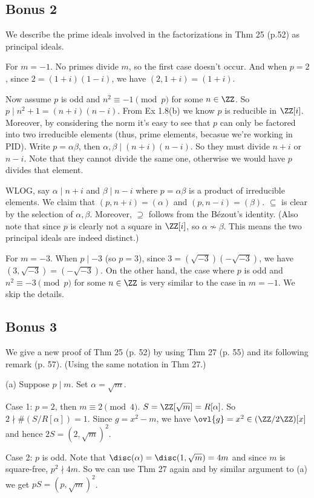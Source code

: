 \documentclass[../Chapter.tex]{subfiles}
\begin{document}
\subsection*{Bonus 2}

We describe the prime ideals involved in the factorizations in Thm 25 (p.52) as principal ideals.

For $m=-1$. No primes divide $m$, so the first case doesn't occur. And when $p=2$, since $2=(1+i)(1-i)$, we have $(2,1+i)=(1+i)$.

Now assume $p$ is odd and $n^2\equiv -1 \pmod{p}$ for some $n\in\ZZ$. So $p\mid n^2+1=(n+i)(n-i)$. From Ex 1.8(b) we know $p$ is reducible in $\ZZ[i]$. Moreover, by considering the norm it's easy to see that $p$ can only be factored into two irreducible elements (thus, prime elements, becasue we're working in PID). Write $p=\alpha\beta$, then $\alpha,\beta\mid(n+i)(n-i)$. So they must divide $n+i$ or $n-i$. Note that they cannot divide the same one, otherwise we would have $p$ divides that element.

WLOG, say $\alpha\mid n+i$ and $\beta\mid n-i$ where $p=\alpha\beta$ is a product of irreducible elements. We claim that $(p,n+i)=(\alpha)$ and $(p,n-i)=(\beta)$. $\subseteq$ is clear by the selection of $\alpha,\beta$. Moreover, $\supseteq$ follows from the Bézout's identity. (Also note that since $p$ is clearly not a square in $\ZZ[i]$, so $\alpha\nsim\beta$. This means the two principal ideals are indeed distinct.)

For $m=-3$. When $p\mid -3$ (so $p=3$), since $3=(\sqrt{-3})(-\sqrt{-3})$, we have $(3,\sqrt{-3})=(-\sqrt{-3})$. On the other hand, the case where $p$ is odd and $n^2\equiv -3 \pmod{p}$ for some $n\in\ZZ$ is very similar to the case in $m=-1$. We skip the details.

\subsection*{Bonus 3}

We give a new proof of Thm 25 (p. 52) by using Thm 27 (p. 55) and its following remark (p. 57). (Using the same notation in Thm 27.)

(a) Suppose $p\mid m$. Set $\alpha=\sqrt{m}$. 

Case 1: $p=2$, then $m\equiv 2 \pmod{4}$. $S=\ZZ[\sqrt{m}]=R[\alpha]$. So $2\nmid \#(S/R[\alpha])=1$. Since $g=x^2-m$, we have $\ovl{g}=x^2\in(\ZZ/2\ZZ)[x]$ and hence $2S=(2,\sqrt{m})^2$.

Case 2: $p$ is odd. Note that $\disc(\alpha)=\disc(1,\sqrt{m})=4m$ and since $m$ is square-free, $p^2\nmid 4m$. So we can use Thm 27 again and by similar argument to (a) we get $pS=(p,\sqrt{m})^2$.
\end{document}
